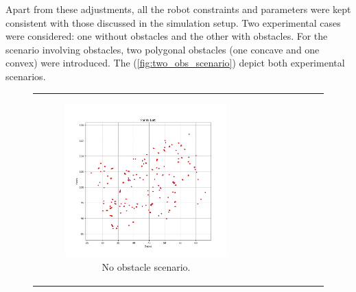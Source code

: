 \vspace*{6mm}   


Apart from these adjustments, all the robot constraints and parameters were kept consistent with those discussed in the simulation setup. Two experimental cases were considered: one without obstacles and the other with obstacles. For the scenario involving obstacles, two polygonal obstacles (one concave and one convex) were introduced. The (\autoref{fig:two_obs_scenario}) depict both experimental scenarios. 


\begin{figure}[H]
    \centering
    \begin{tabular}{cc} 
        \begin{subfigure}{0.4\textwidth}
            \centering
            \includegraphics[width=\textwidth]{Images/real_robot/no_obs_scene.png}
            \caption{No obstacle scenario.}
        \end{subfigure} 
        &
        \begin{subfigure}{0.4\textwidth}
            \centering

\end{subfigure}
\end{tabular}
\end{figure}
